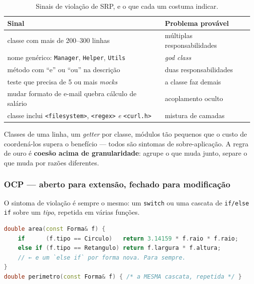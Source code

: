 \begin{table}[htbp]
\centering
\caption{Sinais de violação de SRP, e o que cada um costuma indicar.}
\label{tab:srp-sinais}
\footnotesize
\begin{tabular}{@{}ll@{}}
\toprule
\textbf{Sinal} & \textbf{Problema provável} \\
\midrule
classe com mais de 200--300 linhas                       & múltiplas responsabilidades \\
nome genérico: \texttt{Manager}, \texttt{Helper}, \texttt{Utils} & \emph{god class} \\
método com ``e'' ou ``ou'' na descrição                  & duas responsabilidades \\
teste que precisa de 5 ou mais \emph{mocks}              & a classe faz demais \\
mudar formato de e-mail quebra cálculo de salário        & acoplamento oculto \\
classe inclui \texttt{<filesystem>}, \texttt{<regex>} \emph{e} \texttt{<curl.h>} & mistura de camadas \\
\bottomrule
\end{tabular}
\end{table}

\begin{armadilha}
Classes de uma linha, um \emph{getter} por classe, módulos tão pequenos que o
custo de coordená-los supera o benefício --- todos são sintomas de
sobre-aplicação. A regra de ouro é \textbf{coesão acima de granularidade}:
agrupe o que muda junto, separe o que muda por razões diferentes.
\end{armadilha}

\subsubsection{OCP --- aberto para extensão, fechado para modificação}

O sintoma de violação é sempre o mesmo: um \texttt{switch} ou uma cascata de
\texttt{if/else if} sobre um \emph{tipo}, repetida em várias funções.

\begin{lstlisting}[style=bt, language=C++,
    caption={A cascata, e o motivo de ela não escalar.}]
double area(const Forma& f) {
    if      (f.tipo == Circulo)   return 3.14159 * f.raio * f.raio;
    else if (f.tipo == Retangulo) return f.largura * f.altura;
    // ← e um `else if` por forma nova. Para sempre.
}
double perimetro(const Forma& f) { /* a MESMA cascata, repetida */ }
\end{lstlisting}

